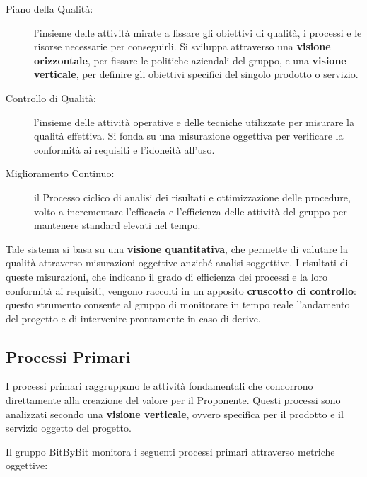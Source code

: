 \documentclass[a4paper,12pt]{article}
\begin{document}
\begin{description}
    \item[Piano della Qualità:] l'insieme delle attività mirate a fissare gli obiettivi di qualità, i processi e le risorse necessarie per conseguirli. Si sviluppa attraverso una \textbf{visione orizzontale}, per fissare le politiche aziendali del gruppo, e una \textbf{visione verticale}, per definire gli obiettivi specifici del singolo prodotto o servizio.
    \item[Controllo di Qualità:] l'insieme delle attività operative e delle tecniche utilizzate per misurare la qualità effettiva. Si fonda su una misurazione oggettiva per verificare la conformità ai requisiti e l'idoneità all'uso.
    \item[Miglioramento Continuo:] il Processo ciclico di analisi dei risultati e ottimizzazione delle procedure, volto a incrementare l'efficacia e l'efficienza delle attività del gruppo per mantenere standard elevati nel tempo.
\end{description}

Tale sistema si basa su una \textbf{visione quantitativa}, che permette di valutare la qualità attraverso misurazioni oggettive anziché analisi soggettive. I risultati di queste misurazioni, che indicano il grado di efficienza dei processi e la loro conformità ai requisiti, vengono raccolti in un apposito \textbf{cruscotto di controllo}: questo strumento consente al gruppo di monitorare in tempo reale l'andamento del progetto e di intervenire prontamente in caso di derive.

\subsection{Processi Primari}\label{sec:processi_primari}
I processi primari raggruppano le attività fondamentali che concorrono direttamente alla creazione del valore per il Proponente. Questi processi sono analizzati secondo una \textbf{visione verticale}, ovvero specifica per il prodotto e il servizio oggetto del progetto. 

Il gruppo BitByBit monitora i seguenti processi primari attraverso metriche oggettive:
\end{document}
